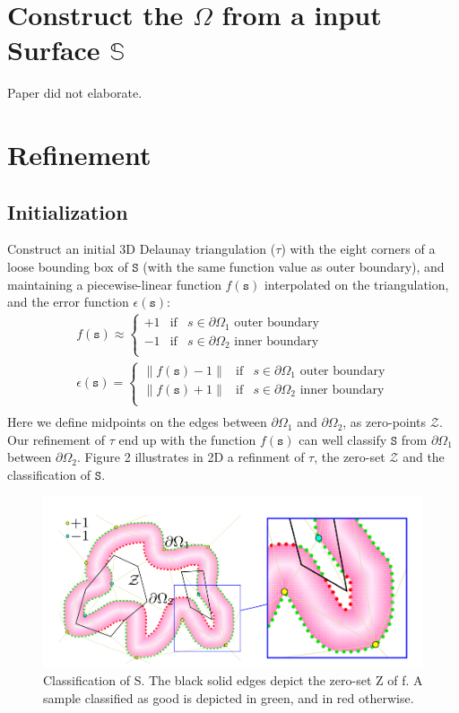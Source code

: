\documentclass{article}
\theoremstyle{definition}
\theoremstyle{remark}
\begin{document}
\section{Construct the $\Omega$ from a input Surface $\mathbb{S}$}
Paper did not elaborate.
\section{Refinement}
\subsection{Initialization}
Construct an initial 3D Delaunay triangulation ($\tau$) with the eight corners of a loose bounding box of $\mathtt{S}$ (with the same function value as outer boundary),  and maintaining a piecewise-linear function $f(\mathtt{s})$ interpolated on the triangulation, and the error function $\epsilon(\mathtt{s})$:
\begin{equation}
  \begin{array}{l}
f(\mathtt{s}) \approx \left\{
\begin{array}{lcl}
{+1} &\text{if} & s \in \partial \Omega_1 \text{ outer boundary} \\
{-1} &\text{if} & s \in \partial \Omega_2 \text{ inner boundary} \\  
\end{array}  
\right.\\
\epsilon(\mathtt{s}) = \left\{
\begin{array}{lcl}
{\parallel f(\mathtt{s})-1 \parallel} &\text{if} & s \in \partial \Omega_1 \text{ outer boundary} \\
{\parallel f(\mathtt{s})+1 \parallel} &\text{if} & s \in \partial \Omega_2 \text{ inner boundary} \\  
\end{array}  
\right.\\
\end{array}
\end{equation}
Here we define midpoints on the edges between $\partial \Omega_1$ and $\partial \Omega_2$, as zero-points $\mathcal{Z}$. Our refinement of $\tau$ end up with the function $f(\mathtt{s})$ can well classify $\mathtt{S}$ from $\partial \Omega_1$ between $\partial \Omega_2$. Figure 2 illustrates in 2D a refinment of $\tau$, the zero-set $\mathcal{Z}$ and the classification of $\mathtt{S}$.
\begin{figure}[H]
 	\includegraphics[width=12cm]{2}
	\caption[Classification of $\mathcal{S}$]
        {Classification of S. The black solid edges depict the zero-set Z of f. A sample classified as good is depicted in green, and in red otherwise.}
 	\centering
\end{figure}
\end{document}
